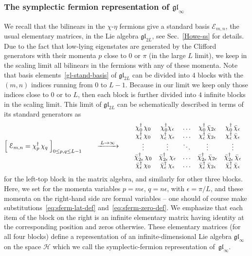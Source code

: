 \documentclass[11pt]{article}
\newcommand{\chid}{\chi^{\dagger}}
\newcommand{\bbchi}{\bar{\chi}}
\newcommand{\bbchid}{\bar{\chi}^{\dagger}}
\newcommand{\Hilb}{\mathcal{H}}
\newcommand{\step}{\epsilon}
\newcommand{\glinf}{\gl_{\infty}}
\newcommand{\Egl}{\mathcal{E}}
\newcommand{\gl}{\mathfrak{gl}}
\theoremstyle{definition}
\begin{document}
\subsubsection{The symplectic fermion representation of $\glinf$}\label{sec:spinf}
We recall that the bilinears in the $\chi$-$\eta$ fermions give a standard basis $\Egl_{m,n}$, the usual elementary matrices, in the Lie algebra
$\gl_{2L}$, see Sec.~\ref{Howe-ss} for details. Due to the fact that low-lying eigenstates are generated by the Clifford generators with their momenta $p$ close to $0$ or $\pi$ (in the large $L$ limit), we keep in the scaling limit all bilinears in the fermions with any of these momenta.
Note that basis elements~\eqref{gl-stand-basis} of $\gl_{2L}$ can be divided into $4$ blocks with the $(m,n)$ indices running from $0$ to $L-1$. Because in our limit we keep only those indices close to $0$ or to $L$, then each block is further divided into $4$ infinite blocks in the scaling limit.
 This  limit of
$\gl_{2L}$ can be schematically described in terms of its standard generators as
\begin{equation}
\Bigl[\; \Egl_{m,n} =  \chid_p\,\chi_q\;\Bigr]_{0\leq p,q\leq L-1} \qquad \xrightarrow{\;L\to\infty\;} \qquad
 \begin{matrix}
 \chid_0\,\chi_0 & \chid_0\chi_{\step} & \ldots & \chid_{0}\,\bbchi_{2\step} & \chid_{0}\,\bbchi_{\step} \\
  \chid_{\step}\,\chi_{0} &\chid_{\step}\,\chi_{\step}   &  \ldots  &   \chid_{\step}\,\bbchi_{2\step} & \chid_{\step}\,\bbchi_{\step}   \\
 \vdots & \vdots & \ddots & \vdots & \vdots\\
   \bbchid_{2\step}\,\chi_0  & \bbchid_{2\step}\,\chi_{\step}  &  \ldots    &   \bbchid_{2\step}\,\bbchi_{2\step}   &  \bbchid_{2\step}\,\bbchi_{\step}   &\\
  \bbchid_{\step}\,\chi_0  & \bbchid_{\step}\,\chi_{\step}  &  \ldots    &   \bbchid_{\step}\,\bbchi_{2\step}   &  \bbchid_{\step}\,\bbchi_{\step}   &
\end{matrix}
\end{equation}
 for the left-top block in the matrix algebra, and similarly for other three blocks.
Here, we set for the momenta variables $p=m\step$, $q=n\step$, with $\step=\pi/L$, and
these momenta on the right-hand side are formal variables -- one should of course make substitutions~\eqref{eq:sferm-lat-def} and~\eqref{eq:sferm-zero-def}.
We emphasize that each item of the  block on the right is an infinite elementary matrix having identity at the corresponding position and zeros otherwise. These elementary matrices (for all four blocks) define a representation of an infinite-dimensional Lie algebra $\glinf$ on the space $\Hilb$ which we call the symplectic-fermion representation of~$\glinf$.
\end{document}
